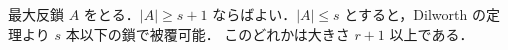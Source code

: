 \subsection{}
最大反鎖 $A$ をとる．$|A| \geq s+1$ ならばよい．$|A| \leq s$ とすると，Dilworth の定理より $s$ 本以下の鎖で被覆可能．
このどれかは大きさ $r+1$ 以上である．